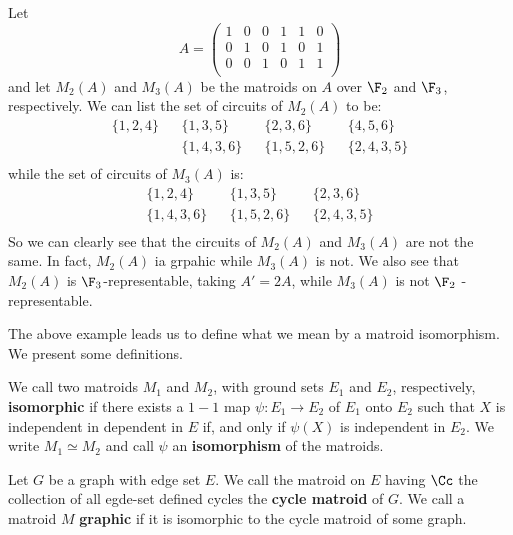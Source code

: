 \begin{example}\label{1.6}
    Let
    \begin{equation*}
        A=\begin{pmatrix}
            1 & 0 & 0 & 1 & 1 & 0 \\
            0 & 1 & 0 & 1 & 0 & 1 \\
            0 & 0 & 1 & 0 & 1 & 1 \\
          \end{pmatrix}
    \end{equation*}
    and let $M_2(A)$ and $M_3(A)$ be the matroids on $A$ over  $\F_2$ and
    $\F_3$, respectively. We can list the set of circuits of $M_2(A)$ to be:
    \begin{align*}
        \{1,2,4\} && \{1,3,5\} && \{2,3,6\} && \{ 4,5,6\} \\
                  && \{1,4,3,6\} && \{1,5,2,6\} && \{2,4,3,5\} \\
    \end{align*}
    while the set of circuits of $M_3(A)$ is:
    \begin{align*}
        \{1,2,4\} && \{1,3,5\} && \{2,3,6\} \\
        \{1,4,3,6\} && \{1,5,2,6\} && \{2,4,3,5\} \\
    \end{align*}
    So we can clearly see that the circuits of $M_2(A)$ and $M_3(A)$ are not the
    same. In fact, $ M_2(A)$ ia grpahic while $ M_3(A)$ is not. We also see that
    $M_2(A)$ is $\F_3$-representable, taking $A'=2A$, while $M_3(A)$ is not
    $\F_2$ -representable.
\end{example}

The above example leads us to define what we mean by a matroid isomorphism. We
present some definitions.

\begin{definition}
    We call two matroids $M_1$ and $M_2$, with ground sets $E_1$ and $E_2$,
    respectively, \textbf{isomorphic} if there exists a $1-1$ map  $\psi:E_1
    \rightarrow E_2$ of $E_1$ onto $E_2$ such that $X$ is independent in
    dependent in $E$ if, and only if  $\psi(X)$ is independent in $E_2$. We
    write $M_1 \simeq M_2$ and call $\psi$ an  \textbf{isomorphism} of the
    matroids.
\end{definition}

\begin{definition}
    Let $G$ be a graph with edge set $E$. We call the matroid on $E$ having
    $\Cc$ the collection of all egde-set defined cycles the  \textbf{cycle
    matroid} of $G$. We call a matroid  $M$  \textbf{graphic} if it is
    isomorphic to the cycle matroid of some graph.
\end{definition}

